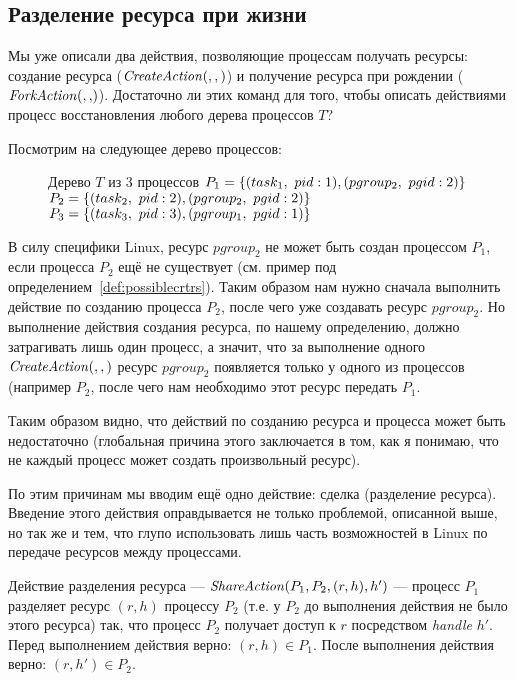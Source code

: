 \subsection{Разделение ресурса при жизни}

Мы уже описали два действия, позволяющие процессам получать ресурсы: создание ресурса ($\text{\textit{CreateAction}}(, , )$) и получение ресурса при рождении ($\crfork{}{}$). Достаточно ли этих команд для того, чтобы описать действиями процесс восстановления любого дерева процессов $T$?

Посмотрим на следующее дерево процессов:

\begin{figure}[ht!]
\centering
{}
\begin{caption}{Дерево $T$ из 3 процессов}
$P_1 = \xbrace{(task_1,\ pid: 1), (pgroup_2,\ pgid: 2)}$\\
$P_2 = \xbrace{(task_2,\ pid: 2), (pgroup_2,\ pgid: 2)}$\\
$P_3 = \xbrace{(task_3,\ pid: 3), (pgroup_1,\ pgid: 1)}$
\end{caption}
\end{figure}

В силу специфики Linux, ресурс $pgroup_2$ не может быть создан процессом $P_1$, если процесса $P_2$ ещё не существует (см. пример под определением~\ref{def:possiblecrtrs}). Таким образом нам нужно сначала выполнить действие по созданию процесса $P_2$, после чего уже создавать ресурс $pgroup_2$. Но выполнение действия создания ресурса, по нашему определению, должно затрагивать лишь один процесс, а значит, что за выполнение одного $\text{\textit{CreateAction}}(, , )$ ресурс $pgroup_2$ появляется только у одного из процессов (например $P_2$, после чего нам необходимо этот ресурс передать $P_1$.

Таким образом видно, что действий по созданию ресурса и процесса может быть недостаточно (глобальная причина этого заключается в том, как я понимаю, что не каждый процесс может создать произвольный ресурс).

По этим причинам мы вводим ещё одно действие: сделка (разделение ресурса). Введение этого действия оправдывается не только проблемой, описанной выше, но так же и тем, что глупо использовать лишь часть возможностей в Linux по передаче ресурсов между процессами.

\begin{defn}
\label{def:shareact}
Действие разделения ресурса --- $\text{\textit{ShareAction}}(P_1, P_2, (r, h), h')$ --- процесс $P_1$ разделяет ресурс $(r, h)$ процессу $P_2$ (т.е. у $P_2$ до выполнения действия не было этого ресурса) так, что процесс $P_2$ получает доступ к $r$ посредством \textit{handle} $h'$. Перед выполнением действия верно: $(r, h) \in P_1$. После выполнения действия верно: $(r, h') \in P_2$.
\end{defn}


